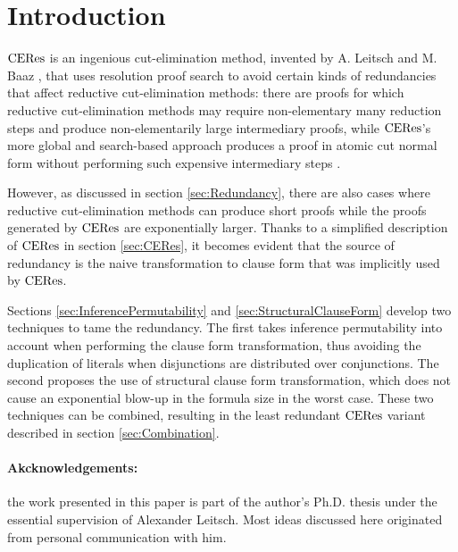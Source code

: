 \section{Introduction}

$\mathrm{CERes}$ is an ingenious cut-elimination method, invented by A. Leitsch and M. Baaz \cite{BaazLeitsch1999MethodsofCut-Elimination,BaazLeitsch2000Cut-eliminationandRedundancy-eliminationbyResolution,BaazLeitsch2006Towardsaclausalanalysisofcut-elimination}, that uses resolution proof search to avoid certain kinds of redundancies that affect reductive cut-elimination methods: there are proofs for which reductive cut-elimination methods may require non-elementary many reduction steps and produce non-elementarily large intermediary proofs, while $\mathrm{CERes}$'s more global and search-based approach produces a proof in atomic cut normal form without performing such expensive intermediary steps \cite{BaazLeitsch2009MethodsofCut-Elimination}. 

However, as discussed in section \ref{sec:Redundancy}, there are also cases where reductive cut-elimination methods can produce short proofs while the proofs generated by $\mathrm{CERes}$ are exponentially larger. Thanks to a simplified description of $\mathrm{CERes}$ in section \ref{sec:CERes}, it becomes evident that the source of redundancy is the naive transformation to clause form that was implicitly used by $\mathrm{CERes}$.

Sections \ref{sec:InferencePermutability} and \ref{sec:StructuralClauseForm} develop two techniques to tame the redundancy. The first takes inference permutability into account when performing the clause form transformation, thus avoiding the duplication of literals when disjunctions are distributed over conjunctions. The second proposes the use of structural clause form transformation, which does not cause an exponential blow-up in the formula size in the worst case. These two techniques can be combined, resulting in the least redundant $\mathrm{CERes}$ variant described in section \ref{sec:Combination}.

\paragraph{Akcknowledgements:} the work presented in this paper is part of the author's Ph.D. thesis \cite{ToDo} under the essential supervision of Alexander Leitsch. Most ideas discussed here originated from personal communication with him.